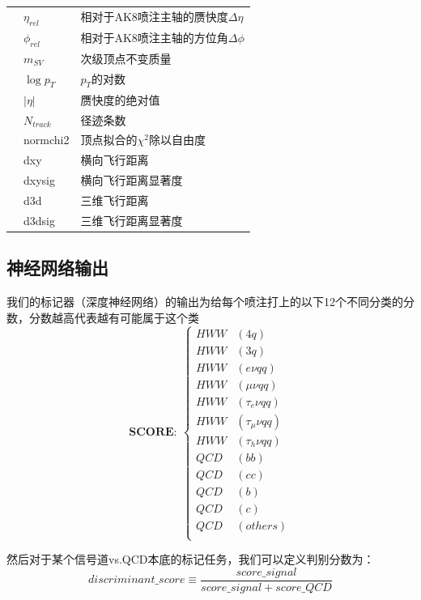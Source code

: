 \begin{table}[htbp]
\begin{tabular}{>{\centering\arraybackslash}p{2.5cm}%
    >{\centering\arraybackslash}p{3cm}%
    >{\centering\arraybackslash}p{9cm}}
    \midrule
    \multirow{11}{*}{次级顶点} & $\eta_{rel}$ & 相对于AK8喷注主轴的赝快度$\Delta \eta$\\
    & $\phi_{rel}$ & 相对于AK8喷注主轴的方位角$\Delta \phi$\\
    & $m_{SV}$ & 次级顶点不变质量\\
    & $\log{p_T}$ & $p_T$的对数\\
    & $|\eta|$ & 赝快度的绝对值\\
    & $N_{track}$ & 径迹条数\\
    & normchi2 & 顶点拟合的$\chi^2$除以自由度\\
    & dxy & 横向飞行距离\\
    & dxysig & 横向飞行距离显著度\\
    & d3d & 三维飞行距离\\
    & d3dsig & 三维飞行距离显著度\\
    \bottomrule\bottomrule
\end{tabular}
\end{table}

\subsection{神经网络输出}
我们的标记器（深度神经网络）的输出为给每个喷注打上的以下12个不同分类的分数，分数越高代表越有可能属于这个类
\begin{equation*}
    \textbf{SCORE}:\ \left\{
    \begin{aligned}
    HWW&(4q)\\
    HWW&(3q)\\
    HWW&(e\nu qq)\\
    HWW&(\mu\nu qq)\\
    HWW&(\tau_e\nu qq)\\
    HWW&(\tau_\mu\nu qq)\\
    HWW&(\tau_h\nu qq)\\
    QCD&(bb)\\
    QCD&(cc)\\
    QCD&(b)\\
    QCD&(c)\\
    QCD&(others)\\
    \end{aligned}
    \right.
\end{equation*}

然后对于某个信号道vs.QCD本底的标记任务，我们可以定义判别分数为：
\begin{equation}
    discriminant\_score\equiv\frac{score\_signal}{score\_signal + score\_QCD}
\end{equation}

